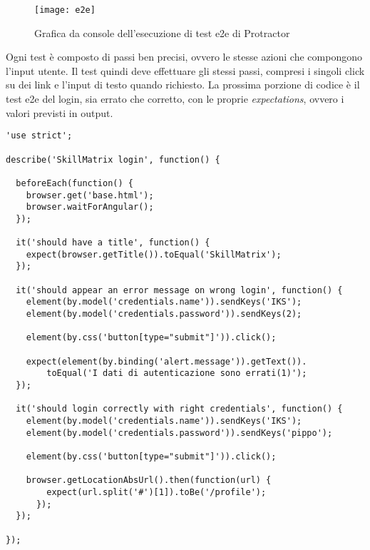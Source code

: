 \begin{figure}[!h] 
    \centering 
    \texttt{[image: e2e]} 
    \caption{Grafica da console dell'esecuzione di test e2e di Protractor}
\end{figure}

Ogni test è composto di passi ben precisi, ovvero le stesse azioni che compongono l'input utente. Il test quindi deve effettuare gli stessi passi, compresi i singoli click su dei link e l'input di testo quando richiesto. La prossima porzione di codice è il test \gls{e2e} del login, sia errato che corretto, con le proprie \emph{expectations}, ovvero i valori previsti in output.

\begin{verbatim}
'use strict';

describe('SkillMatrix login', function() {

  beforeEach(function() {
    browser.get('base.html');
    browser.waitForAngular();
  });

  it('should have a title', function() {
    expect(browser.getTitle()).toEqual('SkillMatrix');
  });

  it('should appear an error message on wrong login', function() {
    element(by.model('credentials.name')).sendKeys('IKS');
    element(by.model('credentials.password')).sendKeys(2);

    element(by.css('button[type="submit"]')).click();

    expect(element(by.binding('alert.message')).getText()).
        toEqual('I dati di autenticazione sono errati(1)');
  });

  it('should login correctly with right credentials', function() {
    element(by.model('credentials.name')).sendKeys('IKS');
    element(by.model('credentials.password')).sendKeys('pippo');

    element(by.css('button[type="submit"]')).click();

    browser.getLocationAbsUrl().then(function(url) {
        expect(url.split('#')[1]).toBe('/profile');
      });
  });
  
});
\end{verbatim}